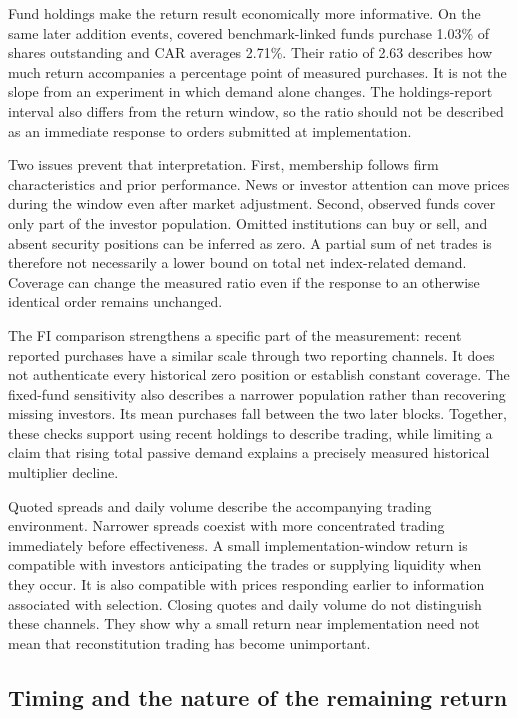Fund holdings make the return result economically more informative. On the same later addition events, covered benchmark-linked funds purchase 1.03\% of shares outstanding and CAR averages 2.71\%. Their ratio of 2.63 describes how much return accompanies a percentage point of measured purchases. It is not the slope from an experiment in which demand alone changes. The holdings-report interval also differs from the return window, so the ratio should not be described as an immediate response to orders submitted at implementation.

Two issues prevent that interpretation. First, membership follows firm characteristics and prior performance. News or investor attention can move prices during the window even after market adjustment. Second, observed funds cover only part of the investor population. Omitted institutions can buy or sell, and absent security positions can be inferred as zero. A partial sum of net trades is therefore not necessarily a lower bound on total net index-related demand. Coverage can change the measured ratio even if the response to an otherwise identical order remains unchanged.

The FI comparison strengthens a specific part of the measurement: recent reported purchases have a similar scale through two reporting channels. It does not authenticate every historical zero position or establish constant coverage. The fixed-fund sensitivity also describes a narrower population rather than recovering missing investors. Its mean purchases fall between the two later blocks. Together, these checks support using recent holdings to describe trading, while limiting a claim that rising total passive demand explains a precisely measured historical multiplier decline.

Quoted spreads and daily volume describe the accompanying trading environment. Narrower spreads coexist with more concentrated trading immediately before effectiveness. A small implementation-window return is compatible with investors anticipating the trades or supplying liquidity when they occur. It is also compatible with prices responding earlier to information associated with selection. Closing quotes and daily volume do not distinguish these channels. They show why a small return near implementation need not mean that reconstitution trading has become unimportant.

\subsection{Timing and the nature of the remaining return}

